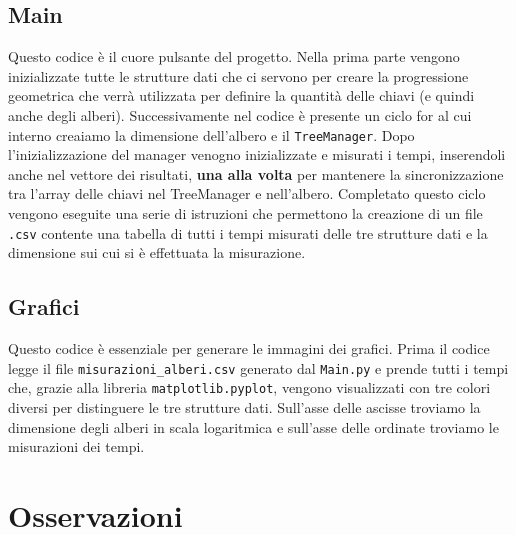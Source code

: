 \documentclass{article}
\begin{document}
\subsection{Main}
Questo codice è il cuore pulsante del progetto. Nella prima parte vengono inizializzate tutte le strutture dati che ci servono per creare la progressione geometrica che verrà utilizzata per definire la quantità delle chiavi (e quindi anche degli alberi). Successivamente nel codice è presente un ciclo for al cui interno creaiamo la dimensione dell'albero e il \verb|TreeManager|. Dopo l'inizializzazione del manager venogno inizializzate e misurati i tempi, inserendoli anche nel vettore dei risultati, \textbf{una alla volta} per mantenere la sincronizzazione tra l'array delle chiavi nel TreeManager e nell'albero. Completato questo ciclo vengono eseguite una serie di istruzioni che permettono la creazione di un file \verb|.csv| contente una tabella di tutti i tempi misurati delle tre strutture dati e la dimensione sui cui si è effettuata la misurazione.
\subsection{Grafici}
Questo codice è essenziale per generare le immagini dei grafici. Prima il codice legge il file \verb|misurazioni_alberi.csv| generato dal \verb|Main.py| e prende tutti i tempi che, grazie alla libreria \verb|matplotlib.pyplot|, vengono visualizzati con tre colori diversi per distinguere le tre strutture dati. Sull'asse delle ascisse troviamo la dimensione degli alberi in scala logaritmica e sull'asse delle ordinate troviamo le misurazioni dei tempi.
\section{Osservazioni}
\end{document}
